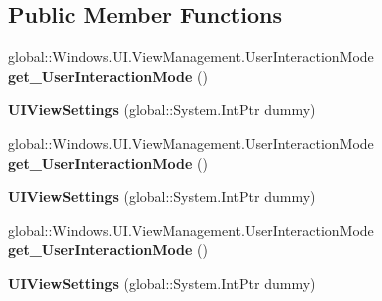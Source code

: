 \subsection*{Public Member Functions}
\begin{DoxyCompactItemize}
\item 
\mbox{\label{class_windows_1_1_u_i_1_1_view_management_1_1_u_i_view_settings_a5539be61515aa963fb6f97642dedc4c0}} 
global\+::\+Windows.\+U\+I.\+View\+Management.\+User\+Interaction\+Mode {\bfseries get\+\_\+\+User\+Interaction\+Mode} ()
\item 
\mbox{\label{class_windows_1_1_u_i_1_1_view_management_1_1_u_i_view_settings_a322a02168f2379ad66c0438f9bdd15c6}} 
{\bfseries U\+I\+View\+Settings} (global\+::\+System.\+Int\+Ptr dummy)
\item 
\mbox{\label{class_windows_1_1_u_i_1_1_view_management_1_1_u_i_view_settings_a5539be61515aa963fb6f97642dedc4c0}} 
global\+::\+Windows.\+U\+I.\+View\+Management.\+User\+Interaction\+Mode {\bfseries get\+\_\+\+User\+Interaction\+Mode} ()
\item 
\mbox{\label{class_windows_1_1_u_i_1_1_view_management_1_1_u_i_view_settings_a322a02168f2379ad66c0438f9bdd15c6}} 
{\bfseries U\+I\+View\+Settings} (global\+::\+System.\+Int\+Ptr dummy)
\item 
\mbox{\label{class_windows_1_1_u_i_1_1_view_management_1_1_u_i_view_settings_a5539be61515aa963fb6f97642dedc4c0}} 
global\+::\+Windows.\+U\+I.\+View\+Management.\+User\+Interaction\+Mode {\bfseries get\+\_\+\+User\+Interaction\+Mode} ()
\item 
\mbox{\label{class_windows_1_1_u_i_1_1_view_management_1_1_u_i_view_settings_a322a02168f2379ad66c0438f9bdd15c6}} 
{\bfseries U\+I\+View\+Settings} (global\+::\+System.\+Int\+Ptr dummy)
\item 
\mbox{\label{class_windows_1_1_u_i_1_1_view_management_1_1_u_i_view_settings_a5539be61515aa963fb6f97642dedc4c0}} 

\end{DoxyCompactItemize}
